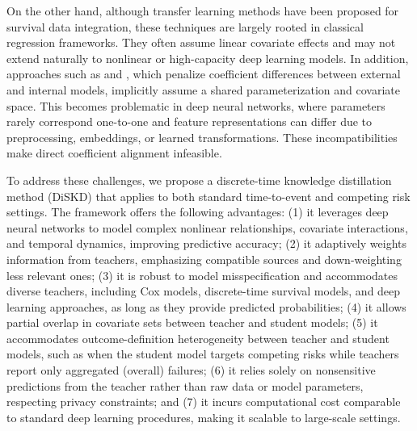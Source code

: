 \documentclass{article}
\theoremstyle{plain}
\theoremstyle{definition}
\theoremstyle{remark}
\begin{document}



On the other hand, although transfer learning methods \citep{chen2021combining, sheng2021synthesizing, cheng2023semiparametric, wang2025kullback} have been proposed for survival data integration,  these techniques are largely rooted in classical regression frameworks. They often assume linear covariate effects and may not extend naturally to nonlinear or high-capacity deep learning models. In addition, approaches such as  \citet{li2022transfer} and \citet{tian2023transfer}, which penalize coefficient differences between external and internal models, implicitly assume a shared parameterization and covariate space. This becomes problematic in deep neural networks, where parameters rarely correspond one-to-one and feature representations can differ due to preprocessing, embeddings, or learned transformations. These incompatibilities make direct coefficient alignment infeasible. 




To address these challenges, we propose a discrete-time knowledge distillation method (DiSKD) that applies to both standard time-to-event and competing risk settings. The framework offers the following advantages:
(1) it leverages deep neural networks to model complex nonlinear relationships, covariate interactions, and temporal dynamics, improving predictive accuracy;
(2) it adaptively weights information from teachers, emphasizing compatible sources and down-weighting less relevant ones;
(3) it is robust to model misspecification and accommodates diverse teachers, including Cox  models, discrete-time survival models, and deep learning approaches, as long as they provide predicted probabilities;
(4) it allows partial overlap in covariate sets between teacher and student models;
(5) it accommodates outcome-definition heterogeneity between teacher and student models, such as when the student model targets competing risks while teachers report only aggregated (overall) failures; 
(6) it relies solely on nonsensitive predictions from the teacher rather than raw data or model parameters, respecting privacy constraints; and
(7) it incurs computational cost comparable to standard deep learning procedures, making it scalable to large-scale settings.
\end{document}
